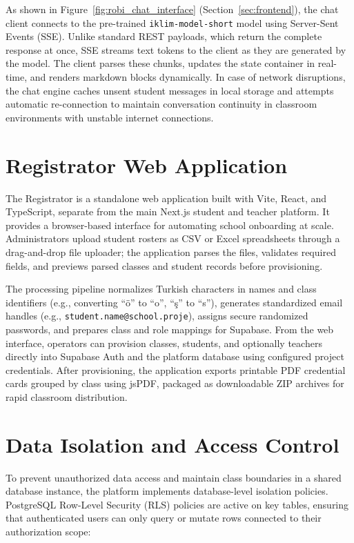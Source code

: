 \documentclass[12pt,a4paper,oneside]{report}
\begin{document}
    As shown in Figure~\ref{fig:robi_chat_interface} (Section~\ref{sec:frontend}), the chat client connects to the pre-trained \texttt{iklim-model-short} model using Server-Sent Events (SSE). Unlike standard REST payloads, which return the complete response at once, SSE streams text tokens to the client as they are generated by the model. The client parses these chunks, updates the state container in real-time, and renders markdown blocks dynamically. In case of network disruptions, the chat engine caches unsent student messages in local storage and attempts automatic re-connection to maintain conversation continuity in classroom environments with unstable internet connections.

    \section{Registrator Web Application}
    The Registrator is a standalone web application built with Vite, React, and TypeScript, separate from the main Next.js student and teacher platform. It provides a browser-based interface for automating school onboarding at scale. Administrators upload student rosters as CSV or Excel spreadsheets through a drag-and-drop file uploader; the application parses the files, validates required fields, and previews parsed classes and student records before provisioning.

    The processing pipeline normalizes Turkish characters in names and class identifiers (e.g., converting ``ö'' to ``o'', ``ş'' to ``s''), generates standardized email handles (e.g., \texttt{student.name@school.proje}), assigns secure randomized passwords, and prepares class and role mappings for Supabase. From the web interface, operators can provision classes, students, and optionally teachers directly into Supabase Auth and the platform database using configured project credentials. After provisioning, the application exports printable PDF credential cards grouped by class using jsPDF, packaged as downloadable ZIP archives for rapid classroom distribution.

    \section{Data Isolation and Access Control}
    \label{sec:security}

    To prevent unauthorized data access and maintain class boundaries in a shared database instance, the platform implements database-level isolation policies. PostgreSQL Row-Level Security (RLS) policies are active on key tables, ensuring that authenticated users can only query or mutate rows connected to their authorization scope:
\end{document}
